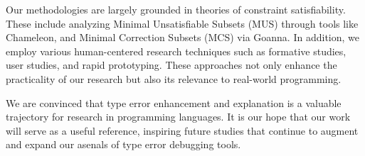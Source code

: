 Our methodologies are largely grounded in theories of constraint satisfiability. These include analyzing Minimal Unsatisfiable Subsets (MUS) through tools like Chameleon, and Minimal Correction Subsets (MCS) via Goanna. In addition, we employ various human-centered research techniques such as formative studies, user studies, and rapid prototyping. These approaches not only enhance the practicality of our research but also its relevance to real-world programming.

We are convinced that type error enhancement and explanation is a valuable trajectory for research in programming languages. It is our hope that our work will serve as a useful reference, inspiring future studies that continue to augment and expand our asenals of type error debugging tools.


